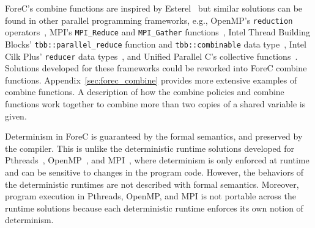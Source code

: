 ForeC's combine functions are inspired by 
Esterel~\cite{timed_compiling_esterel} but similar 
solutions can be found 
in other parallel programming frameworks, e.g., OpenMP's
\verb$reduction$ operators~\cite{multiprocessor_openmp},
MPI's \verb$MPI_Reduce$ and \verb$MPI_Gather$ functions~\cite{multiprocessor_mpi},
Intel Thread Building Blocks' \verb$tbb::parallel_reduce$
function and \verb$tbb::combinable$ data type~\cite{multiprocessor_intel_tbb},
Intel Cilk Plus' \verb$reducer$ data types~\cite{multiprocessor_intel_cilk_plus}, 
and Unified Parallel C's collective functions~\cite{multiprocessing_upc}.
Solutions developed for these frameworks could be 
reworked into ForeC combine functions.
Appendix~\ref{sec:forec_combine} provides more extensive examples
of combine functions. A description of how the combine policies
and combine functions work together to combine more than two copies
of a shared variable is given.

Determinism in ForeC is guaranteed by the formal semantics, and 
preserved by the compiler. This is unlike the
deterministic runtime solutions developed for 
Pthreads~\cite{multiprocessing_grace,multiprocessing_kendo,multiprocessing_coredet,multiprocessing_dthreads},
OpenMP~\cite{multiprocessing_domp}, and 
MPI~\cite{multiprocessing_detmp}, where determinism is only enforced at
runtime and can be sensitive to changes in the program
code. However, the behaviors of the deterministic runtimes are not 
described with formal semantics. Moreover, program execution in Pthreads, OpenMP, and MPI 
is not portable across the runtime solutions because each deterministic
runtime enforces its own notion of
determinism. 
